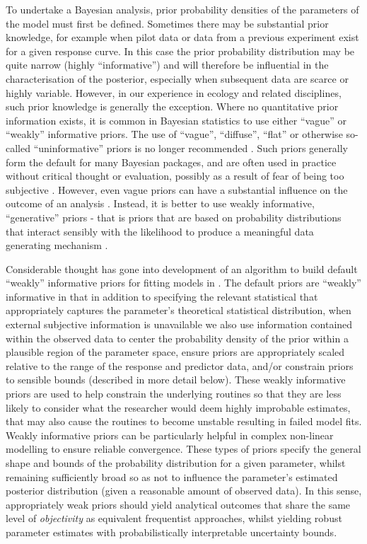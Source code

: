 \documentclass[
  shortnames]{jss}
\begin{document}
To undertake a Bayesian analysis, prior probability densities of the parameters of the model must first be defined. Sometimes there may be substantial prior knowledge, for example when pilot data or data from a previous experiment exist for a given response curve. In this case the prior probability distribution may be quite narrow (highly ``informative'') and will therefore be influential in the characterisation of the posterior, especially when subsequent data are scarce or highly variable. However, in our experience in ecology and related disciplines, such prior knowledge is generally the exception. Where no quantitative prior information exists, it is common in Bayesian statistics to use either ``vague'' or ``weakly'' informative priors. The use of ``vague'', ``diffuse'', ``flat'' or otherwise so-called ``uninformative'' priors is no longer recommended \citep{Banner2020}. Such priors generally form the default for many Bayesian packages, and are often used in practice without critical thought or evaluation, possibly as a result of fear of being too subjective \citep{Banner2020}. However, even vague priors can have a substantial influence on the outcome of an analysis \citep{depaoli2020importance, gelman2017entropy}. Instead, it is better to use weakly informative, ``generative'' priors - that is priors that are based on probability distributions that interact sensibly with the likelihood to produce a meaningful data generating mechanism \citep{gelman2017entropy}.

Considerable thought has gone into development of an algorithm to build default ``weakly'' informative priors for fitting models in . The default priors are ``weakly'' informative in that in addition to specifying the relevant statistical  that appropriately captures the parameter's theoretical statistical distribution, when external
subjective information is unavailable we also use information contained within the observed data to center the probability density of the prior within a plausible region of the parameter space, ensure priors are appropriately scaled relative to the range of the response and predictor data, and/or constrain priors to sensible bounds (described in more detail below). These weakly informative priors are used to help constrain the underlying routines so that they are less likely to consider what the researcher would deem highly improbable estimates, that may also cause the routines to become unstable resulting in failed model fits. Weakly informative priors can be particularly helpful in complex non-linear modelling to ensure reliable convergence. These types of priors specify the general shape and bounds of the probability distribution for a given parameter, whilst remaining sufficiently broad so as not to influence the parameter's estimated posterior distribution (given a reasonable amount of observed data). In this sense, appropriately weak priors should yield analytical outcomes that share the same level of \emph{objectivity} as equivalent frequentist approaches, whilst yielding robust parameter estimates with probabilistically interpretable uncertainty bounds.
\end{document}
